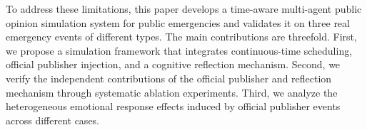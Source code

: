 To address these limitations, this paper develops a time-aware multi-agent public opinion simulation system for public emergencies and validates it on three real emergency events of different types. The main contributions are threefold. First, we propose a simulation framework that integrates continuous-time scheduling, official publisher injection, and a cognitive reflection mechanism. Second, we verify the independent contributions of the official publisher and reflection mechanism through systematic ablation experiments. Third, we analyze the heterogeneous emotional response effects induced by official publisher events across different cases.

%
%
